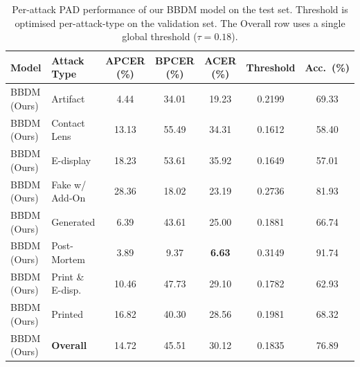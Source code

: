 
\begin{table}[t]
  \centering
  \caption{Per-attack PAD performance of our BBDM model on the test set.
           Threshold is optimised per-attack-type on the validation set.
           The Overall row uses a single global threshold ($\tau = 0.18$).}
  \label{tab:main_results}
  \begin{tabular}{llSSSS[table-format=1.4]S}
    \toprule
    \textbf{Model} & \textbf{Attack Type}
      & \textbf{APCER (\%)} & \textbf{BPCER (\%)}
      & \textbf{ACER (\%)}  & \textbf{Threshold}
      & \textbf{Acc.\ (\%)} \\
    \midrule
    BBDM (Ours) & Artifact          &  4.44 & 34.01 &     19.23 & 0.2199 & 69.33 \\
    BBDM (Ours) & Contact Lens      & 13.13 & 55.49 &     34.31 & 0.1612 & 58.40 \\
    BBDM (Ours) & E-display         & 18.23 & 53.61 &     35.92 & 0.1649 & 57.01 \\
    BBDM (Ours) & Fake w/ Add-On    & 28.36 & 18.02 &     23.19 & 0.2736 & 81.93 \\
    BBDM (Ours) & Generated         &  6.39 & 43.61 &     25.00 & 0.1881 & 66.74 \\
    BBDM (Ours) & Post-Mortem       &  3.89 &  9.37 & \textbf{6.63}  & 0.3149 & 91.74 \\
    BBDM (Ours) & Print \& E-disp.  & 10.46 & 47.73 &     29.10 & 0.1782 & 62.93 \\
    BBDM (Ours) & Printed           & 16.82 & 40.30 &     28.56 & 0.1981 & 68.32 \\
    \midrule
    BBDM (Ours) & \textbf{Overall}  & 14.72 & 45.51 &     30.12 & 0.1835 & 76.89 \\
    \bottomrule
  \end{tabular}
\end{table}


